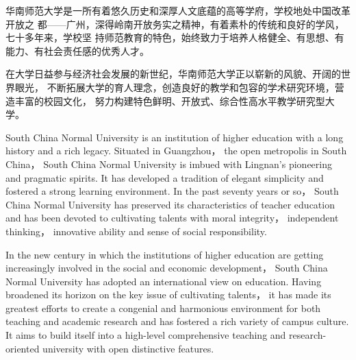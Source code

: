 \begin{cabstract}
华南师范大学是一所有着悠久历史和深厚人文底蕴的高等学府，学校地处中国改革开放之%
都——广州，深得岭南开放务实之精神，有着素朴的传统和良好的学风，七十多年来，学校坚%
持师范教育的特色，始终致力于培养人格健全、有思想、有能力、有社会责任感的优秀人才。%

在大学日益参与经济社会发展的新世纪，华南师范大学正以崭新的风貌、开阔的世界眼光，%
不断拓展大学的育人理念，创造良好的教学和包容的学术研究环境，营造丰富的校园文化，%
努力构建特色鲜明、开放式、综合性高水平教学研究型大学。%
\end{cabstract}

\begin{eabstract}
  South China Normal University is an institution of higher education with a
  long history and a rich legacy. Situated in Guangzhou， the open metropolis in
  South China， South China Normal University is imbued with Lingnan's
  pioneering and pragmatic spirits. It has developed a tradition of elegant
  simplicity and fostered a strong learning environment. In the past seventy
  years or so， South China Normal University has preserved its characteristics
  of teacher education and has been devoted to cultivating talents with moral
  integrity， independent thinking， innovative ability and sense of social
  responsibility.

  In the new century in which the institutions of higher education are getting
  increasingly involved in the social and economic development， South China
  Normal University has adopted an international view on education. Having
  broadened its horizon on the key issue of cultivating talents， it has made its
  greatest efforts to create a congenial and harmonious environment for both
  teaching and academic research and has fostered a rich variety of campus
  culture. It aims to build itself into a high-level comprehensive teaching and
  research-oriented university with open distinctive features.
\end{eabstract}

